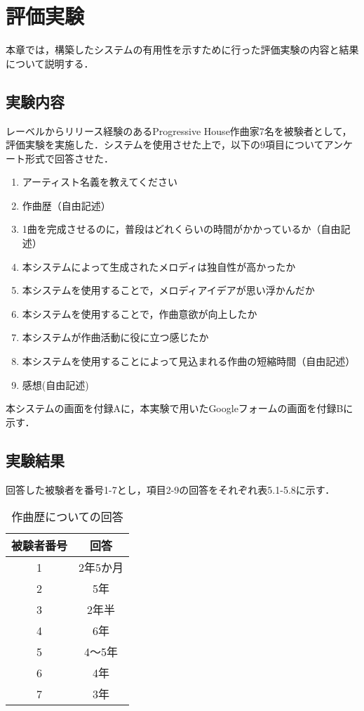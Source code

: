 \chapter{評価実験}
本章では，構築したシステムの有用性を示すために行った評価実験の内容と結果について説明する．

\section{実験内容}
レーベルからリリース経験のあるProgressive House作曲家7名を被験者として，評価実験を実施した．システムを使用させた上で，以下の9項目についてアンケート形式で回答させた．
\begin{enumerate}
  \item アーティスト名義を教えてください
  \item 作曲歴（自由記述）
  \item 1曲を完成させるのに，普段はどれくらいの時間がかかっているか（自由記述）
  \item 本システムによって生成されたメロディは独自性が高かったか
  \item 本システムを使用することで，メロディアイデアが思い浮かんだか
  \item 本システムを使用することで，作曲意欲が向上したか
  \item 本システムが作曲活動に役に立つ感じたか
  \item 本システムを使用することによって見込まれる作曲の短縮時間（自由記述）
  \item 感想(自由記述)
\end{enumerate}
本システムの画面を付録Aに，本実験で用いたGoogleフォームの画面を付録Bに示す．

\section{実験結果}
回答した被験者を番号1-7とし，項目2-9の回答をそれぞれ表5.1-5.8に示す．

\begin{table}[htbp]
  \begin{center}
    \caption{作曲歴についての回答}
    \begin{tabular}{|c|c|}
      \hline
      被験者番号 & 回答 \rule[-3mm]{0mm}{8mm}\\ \hline \hline
      1 & 2年5か月\rule[-3mm]{0mm}{8mm} \\ \hline
      2 & 5年\rule[-3mm]{0mm}{8mm} \\ \hline
      3 & 2年半\rule[-3mm]{0mm}{8mm} \\ \hline
      4 & 6年\rule[-3mm]{0mm}{8mm} \\ \hline
      5 & 4〜5年\rule[-3mm]{0mm}{8mm} \\ \hline
      6 & 4年\rule[-3mm]{0mm}{8mm} \\ \hline
      7 & 3年\rule[-3mm]{0mm}{8mm} \\ \hline
    \end{tabular}
  \end{center}
\end{table}

